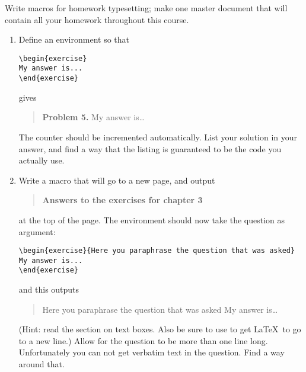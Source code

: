 Write macros for homework typesetting; make one master document
  that will contain all your homework throughout this course.
\begin{enumerate}
\item Define an environment  so that
\begin{verbatim}
\begin{exercise}
My answer is...
\end{exercise}
\end{verbatim}
gives
\begin{quote}
\textbf{Problem 5.} My answer is\dots
\end{quote}
The counter should be incremented automatically. List your solution in
your answer, and find a way that the listing is guaranteed to be the
code you actually use.
\item Write a macro  that will go to a new page, and
  output
\begin{quote}
\textbf{Answers to the exercises for chapter 3}
\end{quote}
at the top of the page. The  environment should now take
the question as argument:
\begin{verbatim}
\begin{exercise}{Here you paraphrase the question that was asked}
My answer is...
\end{exercise}
\end{verbatim}
and this outputs
\begin{quote}
\begin{exerciseB}{Here you paraphrase the question that was asked}
My answer is\dots
\end{exerciseB}
\end{quote}
(Hint: read the section on text boxes. Also be sure to use  to
get \LaTeX\ to go to a new line.)
Allow for the question to be more than one line long. Unfortunately
you can not get verbatim text in the question. Find a way around that.
\end{enumerate}

